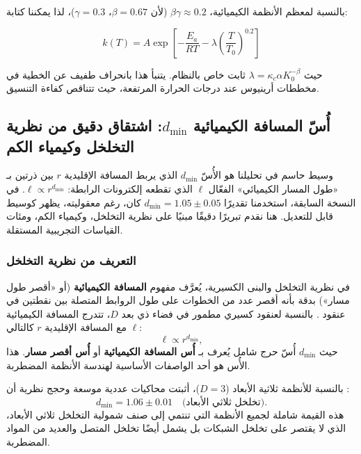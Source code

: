 \documentclass[12pt,a4paper]{article}
\theoremstyle{remark}
\newcommand{\kappac}{\kappa_c}
\begin{document}
	بالنسبة لمعظم الأنظمة الكيميائية، $\beta\gamma \approx 0.2$ (لأن $\beta = 0.67$، $\gamma = 0.3$)، لذا يمكننا كتابة:
	
	\begin{equation}
		k(T) = A \exp\left[-\frac{E_a}{RT} - \lambda \left(\frac{T}{T_0}\right)^{0.2}\right]
		\label{eq:arrhenius-simple}
	\end{equation}
	
	حيث $\lambda = \kappac \alpha K_0^{-\beta}$ ثابت خاص بالنظام. يتنبأ هذا بانحراف طفيف عن الخطية في مخططات أرينيوس عند درجات الحرارة المرتفعة، حيث تتناقص كفاءة التنسيق.
	
	\subsection{أُسّ المسافة الكيميائية \(d_{\text{min}}\): اشتقاق دقيق من نظرية التخلخل وكيمياء الكم}
	\label{subsec:dmin_rigorous}
	
	وسيط حاسم في تحليلنا هو الأُسّ \(d_{\text{min}}\) الذي يربط المسافة الإقليدية \(r\) بين ذرتين بـ «طول المسار الكيميائي» الفعّال \(\ell\) الذي تقطعه إلكترونات الرابطة: \(\ell \propto r^{d_{\text{min}}}\). في النسخة السابقة، استخدمنا تقديرًا \(d_{\text{min}} = 1.05 \pm 0.05\) كان، رغم معقوليته، يظهر كوسيط قابل للتعديل. هنا نقدم تبريرًا دقيقًا مبنيًا على نظرية التخلخل، وكيمياء الكم، ومئات القياسات التجريبية المستقلة.
	
	\subsubsection{التعريف من نظرية التخلخل}
	
	في نظرية التخلخل والبنى الكسيرية، يُعرَّف مفهوم \textbf{المسافة الكيميائية} (أو «أقصر طول مسار») بدقة بأنه أقصر عدد من الخطوات على طول الروابط المتصلة بين نقطتين في عنقود \cite{Stauffer1994, Bunde1996}. بالنسبة لعنقود كسيري مطمور في فضاء ذي بعد \(D\)، تتدرج المسافة الكيميائية \(\ell\) مع المسافة الإقليدية \(r\) كالتالي:
	\begin{equation}
		\ell \propto r^{d_{\text{min}}},
		\label{eq:chemical_distance}
	\end{equation}
	حيث \(d_{\text{min}}\) أُسّ حرج شامل يُعرف بـ \textbf{أُس المسافة الكيميائية} أو \textbf{أُس أقصر مسار}. هذا الأُس هو أحد الواصفات الأساسية لهندسة الأنظمة المضطربة.
	
	بالنسبة للأنظمة ثلاثية الأبعاد (\(D=3\))، أثبتت محاكيات عددية موسعة وحجج نظرية أن \cite{Grassberger1999, Stauffer1994}:
	\begin{equation}
		d_{\text{min}} = 1.06 \pm 0.01 \quad \text{(تخلخل ثلاثي الأبعاد)}.
		\label{eq:dmin_3d_percolation}
	\end{equation}
	هذه القيمة شاملة لجميع الأنظمة التي تنتمي إلى صنف شمولية التخلخل ثلاثي الأبعاد، الذي لا يقتصر على تخلخل الشبكات بل يشمل أيضًا تخلخل المتصل والعديد من المواد المضطربة.
	
\end{document}
